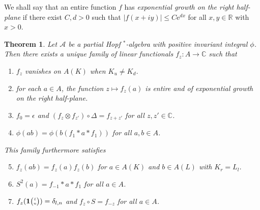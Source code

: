 \documentclass[10pt]{article}
\newcommand{\C}{\mathbb{C}}
\newcommand{\R}{\mathbb{R}}
\newcommand{\Grt}[3]{#1{\tiny {\begin{pmatrix} #2\\#3\end{pmatrix}}}}
\newcommand{\UnitC}[2]{\Grt{\mathbf{1}}{#1}{#2}}
\newtheorem{Theorem}{Theorem}[section]
\theoremstyle{definition}
\numberwithin{equation}{section}
\begin{document}
We shall say that an entire function $f$ has \emph{exponential growth
  on the right half-plane} if there exist $C,d>0$ such that $|f(x+iy)|\leq
C\mathrm{e}^{dx}$  for all $x,y\in \R$ with $x>0$. 

\begin{Theorem} \label{thm:rep-characters} Let $\mathscr{A}$ be a partial Hopf $^*$-algebra with positive invariant integral $\phi$.  Then there exists a unique
  family of linear functionals $f_{z} \colon A\to \C$ such that
\begin{enumerate}[label={(\arabic*)}]
  \item $f_z$ vanishes on $A(K)$ when $K_u\neq K_d$.
  \item for each $a\in A$, the function $z\mapsto f_{z}(a)$ is entire
    and of exponential growth on the right half-plane.
  \item $f_{0} = \epsilon$ and $(f_{z} \otimes f_{z'}) \circ 
    \Delta= f_{z+z'}$ for all $z,z' \in \C$.
  \item $\phi(ab)=\phi(b(f_{1} \ast a \ast f_{1}))$ for all $a,b\in A$.
  \end{enumerate}
  This family furthermore satisfies
  \begin{enumerate}[label={(\arabic*)}]\setcounter{enumi}{4}
  \item $f_z(ab) = f_z(a)f_z(b)$ for $a\in A(K)$ and $b\in A(L)$ with $K_r = L_l$. 
  \item $S^{2}(a)=f_{-1} \ast a \ast f_{1}$ for all $a\in A$.
  \item $f_{z}(\UnitC{l}{n})=\delta_{l,n}$ and $f_{z} \circ S = f_{-z}$ for all $a\in A$.
\end{enumerate}
\end{Theorem}
\end{document}
